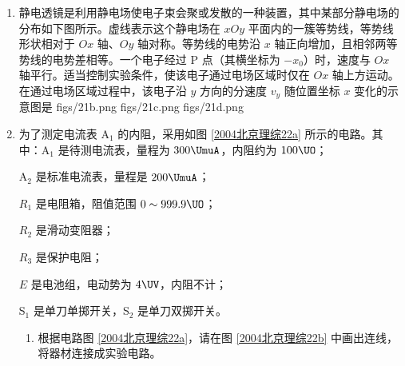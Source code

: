 \documentclass[\gkver]{gaokaozhenti}
\begin{document}
\begin{enumerate}
\item
静电透镜是利用静电场使电子束会聚或发散的一种装置，其中某部分静电场的分布如下图所示。虚线表示这个静电场在 $xOy$ 平面内的一簇等势线，等势线形状相对于 $Ox$ 轴、$Oy$ 轴对称。等势线的电势沿 $x$ 轴正向增加，且相邻两等势线的电势差相等。一个电子经过 P 点（其横坐标为 $-x_{0}$）时，速度与 $Ox$ 轴平行。适当控制实验条件，使该电子通过电场区域时仅在 $Ox$ 轴上方运动。在通过电场区域过程中，该电子沿 $y$ 方向的分速度 $v_{y}$ 随位置坐标 $x$ 变化的示意图是
\onepicture[w=6.14cm]{}
{figs/21b.png}
{figs/21c.png}
{figs/21d.png}

\item
为了测定电流表 A$_{1}$ 的内阻，采用如图 \ref{2004北京理综22a} 所示的电路。其中：A$_{1}$ 是待测电流表，量程为 $300\UmuA$，内阻约为 $100\UO$；

A$_{2}$ 是标准电流表，量程是 $200\UmuA$；

$R_{1}$ 是电阻箱，阻值范围 $0\sim 999.9\UO$；

$R_{2}$ 是滑动变阻器；

$R_{3}$ 是保护电阻；

$E$ 是电池组，电动势为 $4\UV$，内阻不计；

S$_{1}$ 是单刀单掷开关，S$_{2}$ 是单刀双掷开关。


\begin{enumerate}
	\item
	根据电路图 \ref{2004北京理综22a}，请在图 \ref{2004北京理综22b} 中画出连线，将器材连接成实验电路。



\end{enumerate}
\end{enumerate}
\end{document}
